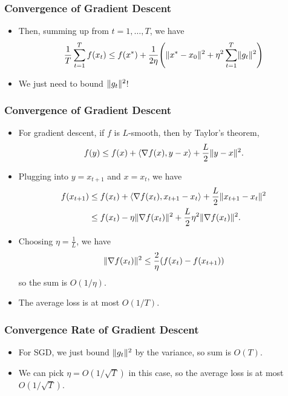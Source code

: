 \documentclass{beamer}
\begin{document}
\begin{frame}
    \frametitle{Convergence of Gradient Descent}
    \begin{itemize}
        \item Then, summing up from $t=1,\dots,T$, we have
        \[
            \frac{1}{T}\sum_{t=1}^T f(x_t) \le f(x^*) + \frac{1}{2\eta}\parens*{\norm{x^* - x_0}^2 + \eta^2 \sum_{t=1}^T \norm{g_t}^2}
        \]
        \item We just need to bound $\lVert g_t\rVert^2$!
    \end{itemize}
\end{frame}

\begin{frame}
    \frametitle{Convergence of Gradient Descent}
    \begin{itemize}
        \item For gradient descent, if $f$ is $L$-smooth, then by Taylor's theorem,
        \[
            f(y) \le f(x) + \langle\nabla f(x), y - x\rangle + \frac{L}{2} \lVert y - x\rVert^2.
        \]
        \item Plugging into $y = x_{t+1}$ and $x = x_t$, we have
        \begin{align*}
            f(x_{t+1})
            &\le f(x_t) + \langle\nabla f(x_t), x_{t+1} - x_t\rangle + \frac{L}{2} \lVert x_{t+1} - x_t\rVert^2\\
            &\le f(x_t) - \eta \lVert\nabla f(x_t)\rVert^2 + \frac{L}{2}\eta^2 \lVert\nabla f(x_t)\rVert^2.
        \end{align*}
        \item Choosing $\eta = \frac{1}{L}$, we have
        \[
            \lVert\nabla f(x_t)\rVert^2 \le \frac{2}{\eta}(f(x_t) - f(x_{t+1}))
        \]
        so the sum is $O(1/\eta)$.
        \item The average loss is at most $O(1/T)$.
    \end{itemize}
\end{frame}
\begin{frame}
    \frametitle{Convergence Rate of Gradient Descent}
    \begin{itemize}
        \item For SGD, we just bound $\lVert g_t\rVert^2$ by the variance, so sum is $O(T)$.
        \item We can pick $\eta = O(1/\sqrt{T})$ in this case, so the average loss is at most $O(1/\sqrt{T})$.
    \end{itemize}
\end{frame}
\end{document}
